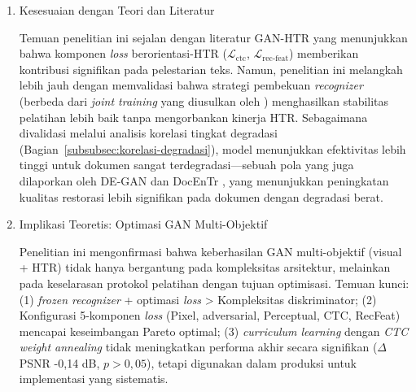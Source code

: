 \begin{enumerate}[leftmargin=1.5em, labelsep=0.5em, itemindent=0pt, label=\arabic*., topsep=0pt, partopsep=0pt]
    Studi ablasi mengungkapkan bahwa arsitektur diskriminator dual-modal menunjukkan kontribusi marginal ($\Delta$PSNR +0,28 dB, $\Delta$CER -0,01\%, $p>0,05$). Sebagaimana dianalisis pada Bagian~\ref{subsubsec:kontribusi-dual-modal}, kontribusi marginal ini disebabkan oleh keterbatasan implementasi (misalnya, penggunaan teks prediksi berderau dan bobot \textit{adversarial} yang rendah), bukan karena keterbatasan konseptual arsitektur. Temuan ini memberikan wawasan teoretis bahwa dalam optimisasi GAN multi-objektif, protokol pelatihan dan strategi seperti \textit{frozen recognizer} lebih dominan daripada penambahan kompleksitas pada arsitektur diskriminator. Secara praktis, hal ini menunjukkan bahwa arsitektur CNN tunggal yang lebih efisien adalah pilihan yang lebih rasional untuk tugas ini, menjadikan komponen dual-modal sebagai kandidat utama untuk penyederhanaan model di masa depan.

    \item Kesesuaian dengan Teori dan Literatur
    
    Temuan penelitian ini sejalan dengan literatur GAN-HTR yang menunjukkan bahwa komponen \textit{loss} berorientasi-HTR ($\mathcal{L}_{\text{ctc}}$, $\mathcal{L}_{\text{rec-feat}}$) memberikan kontribusi signifikan pada pelestarian teks. Namun, penelitian ini melangkah lebih jauh dengan memvalidasi bahwa strategi pembekuan \textit{recognizer} (berbeda dari \textit{joint training} yang diusulkan oleh \textcite{souibgui2022}) menghasilkan stabilitas pelatihan lebih baik tanpa mengorbankan kinerja HTR. Sebagaimana divalidasi melalui analisis korelasi tingkat degradasi (Bagian~\ref{subsubsec:korelasi-degradasi}), model menunjukkan efektivitas lebih tinggi untuk dokumen sangat terdegradasi---sebuah pola yang juga dilaporkan oleh DE-GAN \parencite{souibgui2021} dan DocEnTr \parencite{souibgui2022docentr}, yang menunjukkan peningkatan kualitas restorasi lebih signifikan pada dokumen dengan degradasi berat.

    \item Implikasi Teoretis: Optimasi GAN Multi-Objektif
    
    Penelitian ini mengonfirmasi bahwa keberhasilan GAN multi-objektif (visual + HTR) tidak hanya bergantung pada kompleksitas arsitektur, melainkan pada keselarasan protokol pelatihan dengan tujuan optimisasi. Temuan kunci: (1) \textit{frozen recognizer} + optimasi \textit{loss} > Kompleksitas diskriminator; (2) Konfigurasi 5-komponen \textit{loss} (Pixel, adversarial, Perceptual, CTC, RecFeat) mencapai keseimbangan Pareto optimal; (3) \textit{curriculum learning} dengan \textit{CTC weight annealing} tidak meningkatkan performa akhir secara signifikan ($\Delta$PSNR -0,14 dB, $p>0,05$), tetapi digunakan dalam produksi untuk implementasi yang sistematis.


\end{enumerate}
